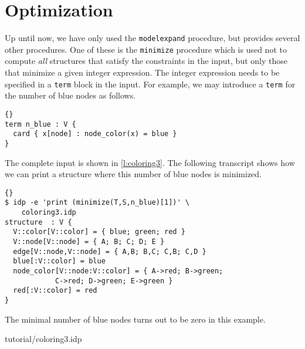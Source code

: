 \documentclass{article}
\begin{document}
\section{Optimization}

Up until now, we have only used the \texttt{modelexpand} procedure,
but \idp provides several other procedures.
One of these is the \texttt{minimize} procedure which is used not to compute
\emph{all} structures that satisfy the constraints in the input,
but only those that minimize a given integer expression.
The integer expression needs to be specified in a \texttt{term} block
in the input.
For example, we may introduce a \texttt{term} for the number
of blue nodes as follows.
\begin{lstlisting}{}
term n_blue : V {
  card { x[node] : node_color(x) = blue } 
}
\end{lstlisting}
The complete input is shown in \autoref{l:coloring3}.
The following transcript shows how we can print a
structure where this number of blue nodes is minimized.
\begin{lstlisting}{}
$ idp -e 'print (minimize(T,S,n_blue)[1])' \
	coloring3.idp 
structure  : V {
  V::color[V::color] = { blue; green; red }
  V::node[V::node] = { A; B; C; D; E }
  edge[V::node,V::node] = { A,B; B,C; C,B; C,D }
  blue[:V::color] = blue
  node_color[V::node:V::color] = { A->red; B->green;
			C->red; D->green; E->green }
  red[:V::color] = red
}
\end{lstlisting}
The minimal number of blue nodes turns out to be zero in this example.


	{tutorial/coloring3.idp}
\end{document}
